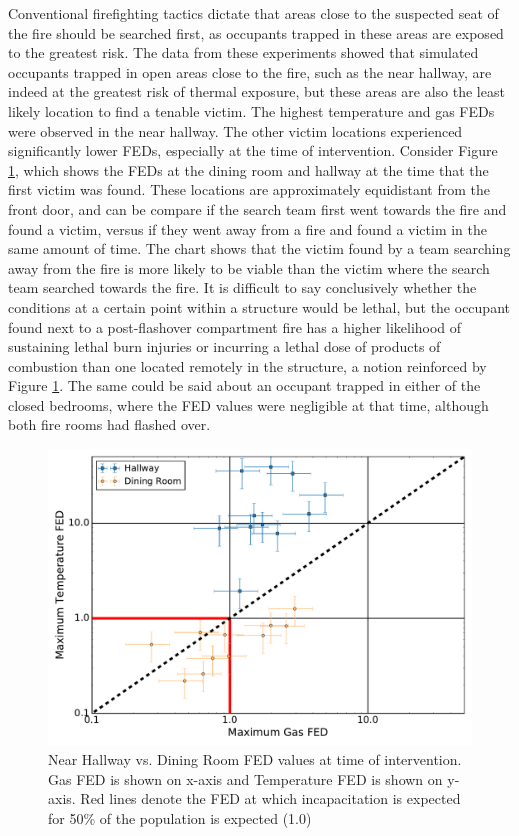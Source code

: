 \documentclass[12pt,oneside]{article}
\begin{document}
Conventional firefighting tactics \cite{Mittendorf,Norman} dictate that areas close to the suspected seat of the fire should be searched first, as occupants trapped in these areas are exposed to the greatest risk. The data from these experiments showed that simulated occupants trapped in open areas close to the fire, such as the near hallway, are indeed at the greatest risk of thermal exposure, but these areas are also the least likely location to find a tenable victim. The highest temperature and gas FEDs were observed in the near hallway. The other victim locations experienced significantly lower FEDs, especially at the time of intervention. Consider Figure \ref{fig:open_FED_compare}, which shows the FEDs at the dining room and hallway at the time that the first victim was found. These locations are approximately equidistant from the front door, and can be compare if the search team first went towards the fire and found a victim, versus if they went away from a fire and found a victim in the same amount of time. The chart shows that the victim found by a team searching away from the fire is more likely to be viable than the victim where the search team searched towards the fire. It is difficult to say conclusively whether the conditions at a certain point within a structure would be lethal, but the occupant found next to a post-flashover compartment fire has a higher likelihood of sustaining lethal burn injuries or incurring a lethal dose of products of combustion than one located remotely in the structure, a notion reinforced by Figure \ref{fig:open_FED_compare}. The same could be said about an occupant trapped in either of the closed bedrooms, where the FED values were negligible at that time, although both fire rooms had flashed over.  

\begin{figure}[!ht]
	\centering
	\includegraphics[width=.75\textwidth]{../Figures/br_compare/Hall_vic1}
	\caption[Near Hallway vs. Dining Room FED values at time of intervention]{Near Hallway vs. Dining Room FED values at time of intervention. Gas FED is shown on x-axis and Temperature FED is shown on y-axis. Red lines denote the FED at which incapacitation is expected for 50\% of the population is expected (1.0)}
	\label{fig:open_FED_compare}
\end{figure}
\end{document}
